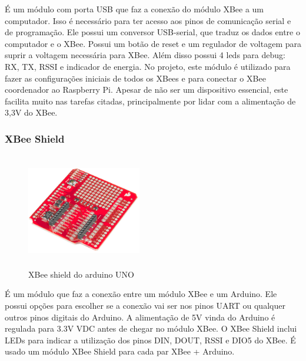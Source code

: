 É um módulo com porta USB que faz a conexão do módulo XBee a um computador. Isso é necessário para ter acesso aos pinos de comunicação serial e de programação. Ele possui um conversor USB-serial, que traduz os dados entre o computador e o XBee. Possui um botão de reset e um regulador de voltagem para suprir a voltagem necessária para XBee. Além disso possui 4 leds para debug: RX, TX, RSSI e indicador de energia. No projeto, este módulo é utilizado para fazer as configurações iniciais de todos os XBees e para conectar o XBee coordenador ao Raspberry Pi. Apesar de não ser um dispositivo essencial, este facilita muito nas tarefas citadas,  principalmente por lidar com a alimentação de 3,3V do XBee.

\subsubsection{XBee Shield}
\begin{figure}[H]
\begin{center}
\includegraphics[width=5cm,height=5cm,keepaspectratio]{figuras/xbee_shield.png}
\caption{\label{fig:xbee shield} XBee shield do arduino UNO}
\end{center}
\end{figure}

É um módulo que faz a conexão entre um módulo XBee e um Arduino. Ele possui opções para escolher se a conexão vai ser nos pinos UART ou qualquer outros pinos digitais do Arduino. A alimentação de 5V vinda do Arduino é regulada para 3.3V VDC antes de chegar no módulo XBee. O XBee Shield inclui LEDs para indicar a utilização dos pinos DIN, DOUT, RSSI e DIO5 do XBee. É usado um módulo XBee Shield para cada par XBee + Arduino.

